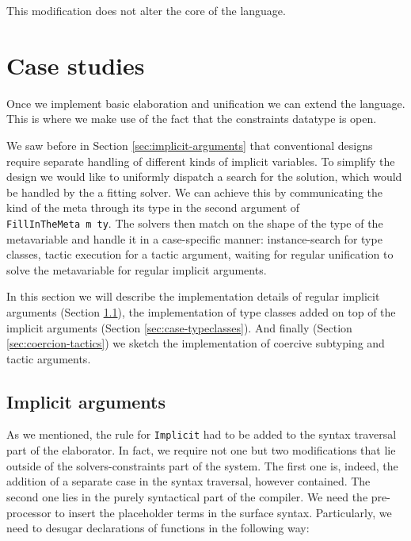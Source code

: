 \documentclass[
  sigconf,
  screen,
  review]{acmart}
\begin{document}
This modification does not alter the core of the language.

\hypertarget{sec:casestudies}{%
\section{Case studies}\label{sec:casestudies}}

Once we implement basic elaboration and unification we can extend the
language. This is where we make use of the fact that the constraints
datatype is open.

We saw before in Section \ref{sec:implicit-arguments} that conventional
designs require separate handling of different kinds of implicit
variables. To simplify the design we would like to uniformly dispatch a
search for the solution, which would be handled by the a fitting solver.
We can achieve this by communicating the kind of the meta through its
type in the second argument of \texttt{FillInTheMeta\ m\ ty}. The
solvers then match on the shape of the type of the metavariable and
handle it in a case-specific manner: instance-search for type classes,
tactic execution for a tactic argument, waiting for regular unification
to solve the metavariable for regular implicit arguments.

In this section we will describe the implementation details of regular
implicit arguments (Section \ref{sec:case-implicits}), the
implementation of type classes added on top of the implicit arguments
(Section \ref{sec:case-typeclasses}). And finally (Section
\ref{sec:coercion-tactics}) we sketch the implementation of coercive
subtyping and tactic arguments.

\hypertarget{sec:case-implicits}{%
\subsection{Implicit arguments}\label{sec:case-implicits}}

As we mentioned, the rule for \texttt{Implicit} had to be added to the
syntax traversal part of the elaborator. In fact, we require not one but
two modifications that lie outside of the solvers-constraints part of
the system. The first one is, indeed, the addition of a separate case in
the syntax traversal, however contained. The second one lies in the
purely syntactical part of the compiler. We need the pre-processor to
insert the placeholder terms in the surface syntax. Particularly, we
need to desugar declarations of functions in the following way:
\end{document}
